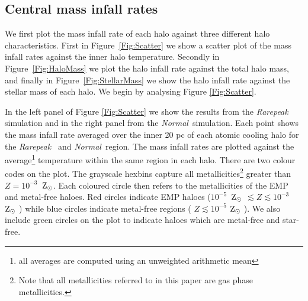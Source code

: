 \documentclass[graphics, twocolumn, usenatbib]{mn2e}
\newcommand{\zsolar} {$\rm{Z_{\odot}}~$}
\newcommand{\zsolarc} {$\rm{Z_{\odot}}$}
\newcommand{\rarepeak} {\textit{Rarepeak~}}
\newcommand{\normal} {\textit{Normal~}}
\begin{document}
\subsection{Central mass infall rates}

\indent We first plot the mass infall rate of each halo against three different halo
characteristics. First in Figure~\ref{Fig:Scatter} we show a scatter plot of the mass infall rates
against the inner halo temperature. Secondly in Figure~\ref{Fig:HaloMass} we plot the halo infall
rate against the total halo mass, and finally in Figure~\ref{Fig:StellarMass} we show the halo
infall rate against the stellar mass of each halo. We begin by analysing Figure \ref{Fig:Scatter}. 

In the left panel of Figure \ref{Fig:Scatter} we show the results from the \rarepeak
simulation and in the right panel from the \normal simulation. Each point shows the mass
infall rate averaged over the inner 20 pc of each atomic cooling halo for the \rarepeak
and \normal region. The mass infall rates are plotted against the average\footnote{all averages are computed using an unweighted arithmetic mean} temperature within
the same region in each halo. There are two colour codes on the plot. The grayscale
hexbins capture all metallicities\footnote{Note that all metallicities
  referred to in this paper are gas phase metallicities.}
greater than $Z = 10^{-3}$~\zsolarc. Each coloured circle then refers to
the metallicities of the EMP and metal-free haloes. Red circles indicate EMP haloes
 ($10^{-5}$~\zsolar $ \lesssim Z \lesssim 10^{-3}$~\zsolar )
while blue circles indicate metal-free regions  ( $Z \lesssim 10^{-5}$ \zsolar ). We also
include green circles on the plot to indicate haloes which are metal-free and star-free. 
\end{document}
